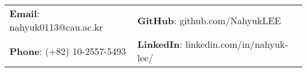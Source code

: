 \documentclass[letterpaper, 11pt]{article}
\begin{document}


\vspace{0.5cm} 
\begin{flushleft}
\begin{tabular}{lll}
\textbf{Email}: nahyuk0113@cau.ac.kr      &
\hspace{0.55in} \textbf{GitHub}: github.com/NahyukLEE \\


\textbf{Phone}: (+82) 10-2557-5493   & 
\hspace{0.55in} \textbf{LinkedIn}: linkedin.com/in/nahyuk-lee/   & 
\end{tabular}
\end{flushleft}


\setlength{\tabcolsep}{8pt}
\end{document}
